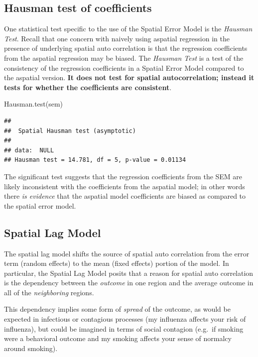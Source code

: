 \documentclass[
]{book}
\newenvironment{Shaded}{\begin{snugshade}}{\end{snugshade}}
\newcommand{\FunctionTok}[1]{\textcolor[rgb]{0.00,0.00,0.00}{#1}}
\newcommand{\NormalTok}[1]{#1}
\begin{document}
\hypertarget{hausman-test-of-coefficients}{%
\subsection{Hausman test of coefficients}\label{hausman-test-of-coefficients}}

One statistical test specific to the use of the Spatial Error Model is the \emph{Hausman Test}. Recall that one concern with naively using aspatial regression in the presence of underlying spatial auto correlation is that the regression coefficients from the aspatial regression may be biased. The \emph{Hausman Test} is a test of the consistency of the regression coefficients in a Spatial Error Model compared to the aspatial version. \textbf{It does not test for spatial autocorrelation; instead it tests for whether the coefficients are consistent}.

\begin{Shaded}
\begin{Highlighting}[]
\FunctionTok{Hausman.test}\NormalTok{(sem)}
\end{Highlighting}
\end{Shaded}

\begin{verbatim}
## 
##  Spatial Hausman test (asymptotic)
## 
## data:  NULL
## Hausman test = 14.781, df = 5, p-value = 0.01134
\end{verbatim}

The significant test suggests that the regression coefficients from the SEM are likely inconsistent with the coefficients from the aspatial model; in other words there \emph{is evidence} that the aspatial model coefficients are biased as compared to the spatial error model.

\hypertarget{spatial-lag-model}{%
\subsection{Spatial Lag Model}\label{spatial-lag-model}}

The spatial lag model shifts the source of spatial auto correlation from the error term (random effects) to the mean (fixed effects) portion of the model. In particular, the Spatial Lag Model posits that a reason for spatial auto correlation is the dependency between the \emph{outcome} in one region and the average outcome in all of the \emph{neighboring} regions.

This dependency implies some form of \emph{spread} of the outcome, as would be expected in infectious or contagious processes (my influenza affects your risk of influenza), but could be imagined in terms of social contagion (e.g.~if smoking were a behavioral outcome and my smoking affects your sense of normalcy around smoking).
\end{document}
